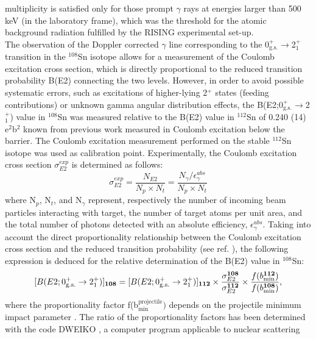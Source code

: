\documentclass[aps,prc,twocolumn,amssymb,showpacs]{revtex4}
\begin{document}
multiplicity is satisfied only for those prompt $\gamma$ rays at
energies larger than 500 keV (in the laboratory frame), which was
the threshold for the atomic background radiation fulfilled by the
RISING experimental set-up.\\
The observation of the Doppler corrected $\gamma$ line
corresponding to the 0$^+_{\text{g.s.}}$$\rightarrow$2$^+_1$
transition in the $^{108}$Sn isotope allows for a measurement of
the Coulomb excitation cross section, which is directly
proportional to the reduced transition probability B(E2)
connecting the two levels. However, in order to avoid possible
systematic errors, such as excitations of higher-lying 2$^+$
states (feeding contributions) or unknown gamma angular
distribution effects, the
B(E2;0$^+_{\text{g.s.}}$$\rightarrow$2$^+_1$) value in $^{108}$Sn
was measured relative to the B(E2) value in $^{112}$Sn of 0.240
(14) e$^2$b$^2$ \cite{ram01} known from previous work measured in
Coulomb excitation below the barrier. The Coulomb excitation
measurement performed on the stable $^{112}$Sn isotope was used as
calibration point. Experimentally, the Coulomb excitation cross
section $\sigma_{E2}^{exp}$ is determined as follows:
\begin{displaymath}
\sigma_{E2}^{exp} = \frac{N_{E2}}{N_p \times N_t} =
\frac{N_{\gamma}/\epsilon_{\gamma}^{abs}}{N_p \times N_t}
\end{displaymath}
where N$_p$, N$_t$, and N$_{\gamma}$ represent, respectively the
number of incoming beam particles interacting with target, the
number of target atoms per unit area, and  the total number of
photons detected with an absolute efficiency,
$\epsilon_{\gamma}^{abs}$. Taking into account the direct
proportionality relationship between the Coulomb excitation cross
section and the reduced transition probability (see ref.
\cite{win79}), the following expression is deduced for the
relative determination of the B(E2) value in $^{108}$Sn:
\begin{displaymath}
\scriptsize [B(E2;0^+_{\text{g.s.}} \rightarrow
2^+_1)]_{\textbf{108}} = [B(E2;0^+_{\text{g.s.}} \rightarrow
2^+_1)]_{\textbf{112}}\times\frac{\sigma^{\textbf{108}}_{E2}}{\sigma^{\textbf{112}}_{E2}}
\times\frac{f(b^{\textbf{112}}_{\text{min}})}{f(b^{\textbf{108}}_{\text{min}})},
\end{displaymath}
where the proportionality factor
f(b$^{\text{projectile}}_{\text{min}})$ depends on the projectile
minimum impact parameter \cite{win79}. The ratio of the
proportionality factors has been determined with the code DWEIKO
\cite{ber03}, a computer program applicable to nuclear scattering
\end{document}
